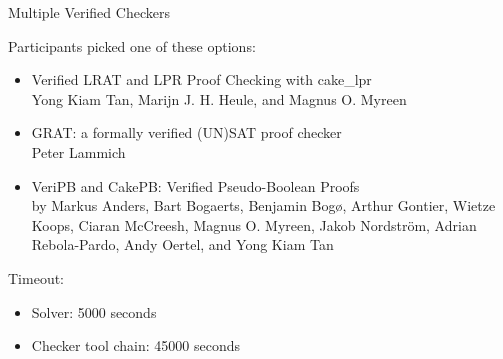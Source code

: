 \documentclass{beamer}
\begin{document}
\begin{frame}{Multiple Verified Checkers}

Participants picked one of these options:
\begin{itemize}
\item Verified LRAT and LPR Proof Checking with cake\_lpr
\\Yong Kiam Tan, Marijn J. H. Heule, and Magnus O. Myreen
\item GRAT: a formally verified (UN)SAT proof checker\\
Peter Lammich
\item VeriPB and CakePB: Verified Pseudo-Boolean Proofs\\
by Markus Anders, Bart Bogaerts, Benjamin Bogø, Arthur Gontier, Wietze Koops, Ciaran McCreesh, Magnus O. Myreen, Jakob Nordström, Adrian Rebola-Pardo, Andy Oertel, and Yong Kiam Tan
\end{itemize}

\bigskip

Timeout:
\begin{itemize}
\item Solver: 5000 seconds
\item Checker tool chain: 45000 seconds
\end{itemize}

\end{frame}

\end{document}
